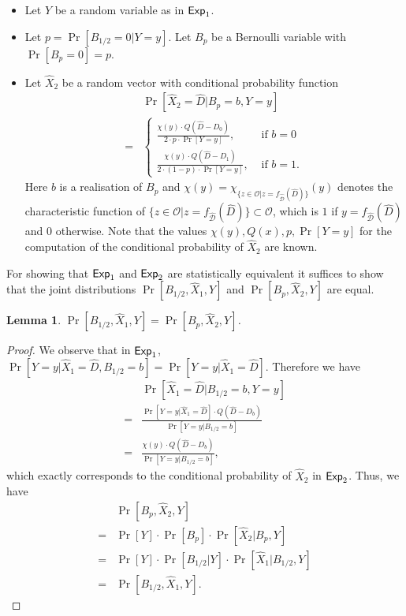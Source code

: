 \documentclass[10pt]{extarticle}
\newtheorem{Lem}[Thm]{Lemma}
\begin{document}
\begin{itemize} 
\item Let $Y$ be a random variable as in $\mbox{\upshape \sffamily Exp}_1$.
\item Let $p=\Pr[B_{1/2}=0|Y=y]$. Let $B_{p}$ be a Bernoulli variable with $\Pr[B_{p}=0]=p$.
\item Let $\widehat{X}_2$ be a random vector with conditional probability function
\begin{align*} 
   & \Pr[\widehat{X}_2=\widehat{D}| B_{p}=b, Y=y]\\
 = & \begin{cases} \frac{\chi(y)\cdot Q(\widehat{D}-D_0)}{2\cdot p\cdot\Pr[Y=y]}, &\mbox{ if } b=0\\ \frac{\chi(y)\cdot Q(\widehat{D}-D_1)}{2\cdot (1-p)\cdot\Pr[Y=y]}, &\mbox{ if } b=1.\end{cases}
\end{align*}
Here $b$ is a realisation of $B_p$ and $\chi(y)=\chi_{\{z\in\mathcal{O} | z=f_{\widehat{\mathcal{D}}}(\widehat{D})\}}(y)$ denotes the characteristic function of $\{z\in\mathcal{O} | z=f_{\widehat{\mathcal{D}}}(\widehat{D})\}\subset\mathcal{O}$, which is $1$ if $y=f_{\widehat{\mathcal{D}}}(\widehat{D})$ and $0$ otherwise. Note that the values $\chi(y),Q(x),p, \Pr[Y=y]$ for the computation of the conditional probability of $\widehat{X}_2$ are known.
\end{itemize}

For showing that $\mbox{\upshape \sffamily Exp}_1$ and $\mbox{\upshape \sffamily Exp}_2$ are statistically equivalent it suffices to show that the joint distributions $\Pr[B_{1/2},\widehat{X}_1,Y]$ and $\Pr[B_{p},\widehat{X}_2,Y]$ are equal.

\begin{Lem}\label{EXPEQUIV} $\Pr[B_{1/2},\widehat{X}_1,Y]=\Pr[B_{p},\widehat{X}_2,Y]$.
\end{Lem}
\begin{proof}
We observe that in $\mbox{\upshape \sffamily Exp}_1$, $\Pr[Y=y| \widehat{X}_1=\widehat{D}, B_{1/2}=b]=\Pr[Y=y| \widehat{X}_1=\widehat{D}]$. Therefore we have
\begin{align*} 
& \Pr[\widehat{X}_1=\widehat{D}| B_{1/2}=b, Y=y]\\
 = & \frac{\Pr[Y=y| \widehat{X}_1=\widehat{D}]\cdot Q(\widehat{D}-D_b)}{\Pr[Y=y| B_{1/2}=b]}\\
 = & \frac{\chi(y)\cdot Q(\widehat{D}-D_b)}{\Pr[Y=y| B_{1/2}=b]},
\end{align*}
which exactly corresponds to the conditional probability of $\widehat{X}_2$ in $\mbox{\upshape \sffamily Exp}_2$. Thus, we have
\begin{align*}
& \Pr[B_{p},\widehat{X}_2,Y]\\
= & \Pr[Y]\cdot\Pr[B_p]\cdot\Pr[\widehat{X}_2| B_{p},Y]\\
= & \Pr[Y]\cdot\Pr[B_{1/2}| Y]\cdot\Pr[\widehat{X}_1| B_{1/2},Y]\\
= & \Pr[B_{1/2},\widehat{X}_1,Y]. 
\end{align*}
\end{proof}
\end{document}
